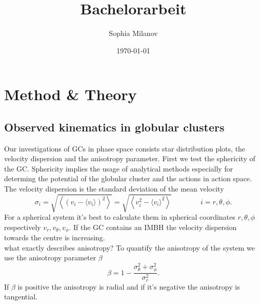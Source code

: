 \documentclass[a4paper,12pt,abstracton]{scrartcl}
\title{Bachelorarbeit}
\author{Sophia Milanov}
\date{\today}
\begin{document}
\onehalfspacing


\begin{abstract}
\blindtext 
\end{abstract}

\newpage

\tableofcontents

\newpage




\newpage
\section{Method \& Theory}
\subsection{Observed kinematics in globular clusters}\label{sec2.1}
Our investigations of \ac{GC}s in phase space consists star distribution plots, the velocity dispersion and the anisotropy parameter. First we test the sphericity of the \ac{GC}. Sphericity implies the usage of analytical methods especially for determing the potential of the globular cluster and the actions in action space. \\ The velocity dispersion is the standard deviation of the mean velocity 
\begin{equation}
\sigma_i=\sqrt{\left\langle(v_i-\langle v_i\rangle)^2\right\rangle}=\sqrt{\left\langle v_i^2-\langle v_i\rangle^2\right\rangle} \qquad\qquad i=r,\theta,\phi.
\end{equation} For a spherical system it's best to calculate them in spherical coordinates \(r,\theta,\phi\) respectively \(v_r,v_{\theta},v_{\phi}\). If the \ac{GC} contains an \ac{IMBH} the velocity dispersion towards the centre is increasing. 
\\ \color{red} what exactly describes anisotropy? \color{black} To quantify the anisotropy of the system we use the anisotropy parameter \(\beta\) 
\begin{equation}
\beta=1-\frac{\sigma_\theta ^2+\sigma_\phi ^2}{\sigma_r ^2}.
\end{equation} If \(\beta\) is positive the anisotropy is radial and if it's negative the anisotropy is tangential.
\end{document}
